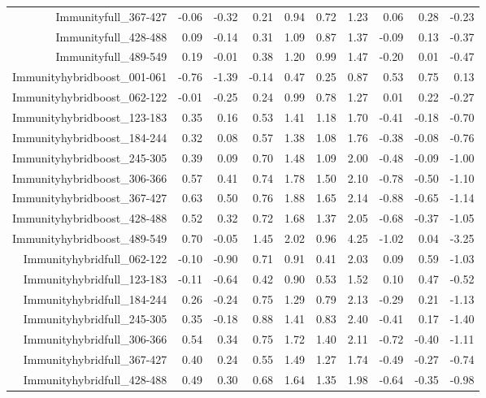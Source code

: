 \begin{table}[ht]
\begin{tabular}{rrrrrrrrrr}
  Immunityfull\_367-427 & -0.06 & -0.32 & 0.21 & 0.94 & 0.72 & 1.23 & 0.06 & 0.28 & -0.23 \\ 
  Immunityfull\_428-488 & 0.09 & -0.14 & 0.31 & 1.09 & 0.87 & 1.37 & -0.09 & 0.13 & -0.37 \\ 
  Immunityfull\_489-549 & 0.19 & -0.01 & 0.38 & 1.20 & 0.99 & 1.47 & -0.20 & 0.01 & -0.47 \\ 
  Immunityhybridboost\_001-061 & -0.76 & -1.39 & -0.14 & 0.47 & 0.25 & 0.87 & 0.53 & 0.75 & 0.13 \\ 
  Immunityhybridboost\_062-122 & -0.01 & -0.25 & 0.24 & 0.99 & 0.78 & 1.27 & 0.01 & 0.22 & -0.27 \\ 
  Immunityhybridboost\_123-183 & 0.35 & 0.16 & 0.53 & 1.41 & 1.18 & 1.70 & -0.41 & -0.18 & -0.70 \\ 
  Immunityhybridboost\_184-244 & 0.32 & 0.08 & 0.57 & 1.38 & 1.08 & 1.76 & -0.38 & -0.08 & -0.76 \\ 
  Immunityhybridboost\_245-305 & 0.39 & 0.09 & 0.70 & 1.48 & 1.09 & 2.00 & -0.48 & -0.09 & -1.00 \\ 
  Immunityhybridboost\_306-366 & 0.57 & 0.41 & 0.74 & 1.78 & 1.50 & 2.10 & -0.78 & -0.50 & -1.10 \\ 
  Immunityhybridboost\_367-427 & 0.63 & 0.50 & 0.76 & 1.88 & 1.65 & 2.14 & -0.88 & -0.65 & -1.14 \\ 
  Immunityhybridboost\_428-488 & 0.52 & 0.32 & 0.72 & 1.68 & 1.37 & 2.05 & -0.68 & -0.37 & -1.05 \\ 
  Immunityhybridboost\_489-549 & 0.70 & -0.05 & 1.45 & 2.02 & 0.96 & 4.25 & -1.02 & 0.04 & -3.25 \\ 
  Immunityhybridfull\_062-122 & -0.10 & -0.90 & 0.71 & 0.91 & 0.41 & 2.03 & 0.09 & 0.59 & -1.03 \\ 
  Immunityhybridfull\_123-183 & -0.11 & -0.64 & 0.42 & 0.90 & 0.53 & 1.52 & 0.10 & 0.47 & -0.52 \\ 
  Immunityhybridfull\_184-244 & 0.26 & -0.24 & 0.75 & 1.29 & 0.79 & 2.13 & -0.29 & 0.21 & -1.13 \\ 
  Immunityhybridfull\_245-305 & 0.35 & -0.18 & 0.88 & 1.41 & 0.83 & 2.40 & -0.41 & 0.17 & -1.40 \\ 
  Immunityhybridfull\_306-366 & 0.54 & 0.34 & 0.75 & 1.72 & 1.40 & 2.11 & -0.72 & -0.40 & -1.11 \\ 
  Immunityhybridfull\_367-427 & 0.40 & 0.24 & 0.55 & 1.49 & 1.27 & 1.74 & -0.49 & -0.27 & -0.74 \\ 
  Immunityhybridfull\_428-488 & 0.49 & 0.30 & 0.68 & 1.64 & 1.35 & 1.98 & -0.64 & -0.35 & -0.98 \\ 

\end{tabular}
\end{table}
